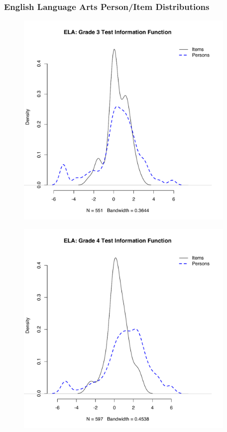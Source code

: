 \documentclass[]{article}
\begin{document}
\subsubsection{English Language Arts Person/Item
Distributions}\label{english-language-arts-personitem-distributions}

\begin{figure}
\centering
\includegraphics[height=4.16667in]{ipdens/ela3ipdens.pdf}
\caption{}
\end{figure}

\begin{figure}
\centering
\includegraphics[height=4.16667in]{ipdens/ela4ipdens.pdf}
\caption{}
\end{figure}
\end{document}
